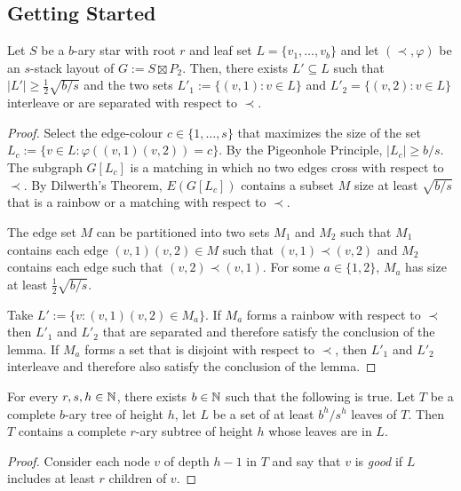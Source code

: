 \documentclass[kpfonts]{patmorin}
\begin{document}
\subsection{Getting Started}

\begin{lem}
  Let $S$ be a $b$-ary star with root $r$ and leaf set $L=\{v_1,\ldots,v_b\}$ and let $(\prec,\varphi)$ be an $s$-stack layout of $G:=S\boxtimes P_2$.  Then, there exists $L'\subseteq L$ such that $|L'|\ge \tfrac{1}{2}\sqrt{b/s}$ and the two sets $L'_1:=\{(v,1):v\in L\}$ and $L'_2=\{(v,2):v\in L\}$ interleave or are separated with respect to $\prec$.  
\end{lem}

\begin{proof}
  Select the edge-colour $c\in\{1,\ldots,s\}$ that maximizes the size of the set $L_c:=\{ v\in L: \varphi((v,1)(v,2))=c\}$.  By the Pigeonhole Principle, $|L_c|\ge b/s$.  The subgraph $G[L_c]$ is a matching in which no two edges cross with respect to $\prec$.  By Dilwerth's Theorem, $E(G[L_c])$ contains a subset $M$ size at least $\sqrt{b/s}$ that is a rainbow or a matching with respect to $\prec$.

  The edge set $M$ can be partitioned into two sets $M_1$ and $M_2$ such that $M_1$ contains each edge $(v,1)(v,2)\in M$ such that $(v,1)\prec (v,2)$ and $M_2$ contains each edge such that $(v,2)\prec (v,1)$.  For some $a\in\{1,2\}$, $M_a$ has size at least $\tfrac{1}{2}\sqrt{b/s}$. 
    
  Take $L':=\{v: (v,1)(v,2)\in M_a\}$.  If $M_a$ forms a rainbow with respect to $\prec$ then $L'_1$ and $L'_2$ that are separated and therefore satisfy the conclusion of the lemma.  If $M_a$ forms a set that is disjoint with respect to $\prec$, then $L'_1$ and $L'_2$ interleave and therefore also satisfy the conclusion of the lemma.
\end{proof}


\begin{lem}
  For every $r,s,h\in\mathbb{N}$, there exists $b\in\mathbb{N}$ such that the following is true.
  Let $T$ be a complete $b$-ary tree of height $h$, let $L$ be a set of at least $b^h/s^h$ leaves of $T$.  Then $T$ contains a complete $r$-ary subtree of height $h$ whose leaves are in $L$.
\end{lem}

\begin{proof}
  Consider each node $v$ of depth $h-1$ in $T$ and say that $v$ is \emph{good} if $L$ includes at least $r$ children of $v$.  
  
\end{proof}
\end{document}
